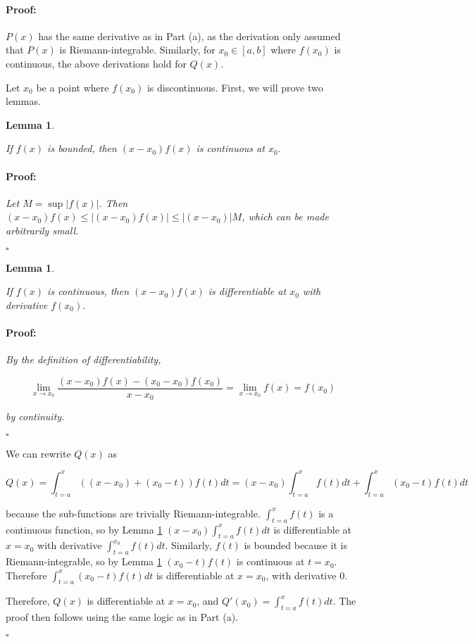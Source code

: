 \documentclass{article}
\newenvironment{proof}{\paragraph{Proof:}}{\hfill$\square$}
\newtheorem{lemma}[theorem]{Lemma}
\begin{document}
\begin{proof}

$P(x)$ has the same derivative as in Part (a), as the derivation only assumed that $P(x)$ is Riemann-integrable. Similarly, for $x_0 \in [a, b]$ where $f(x_0)$ is continuous, the above derivations hold for $Q(x)$.

Let $x_0$ be a point where $f(x_0)$ is discontinuous. First, we will prove two lemmas.

\begin{lemma}
\label{boundedIsCont}

If $f(x)$ is bounded, then $(x - x_0) f(x)$ is continuous at $x_0$.

\begin{proof}

Let $M = \sup |f(x)|$. Then $(x - x_0) f(x) \leq |(x - x_0) f(x)| \leq |(x - x_0)| M$, which can be made arbitrarily small.

\end{proof}
\end{lemma}

\begin{lemma}
\label{contIsDiff}

If $f(x)$ is continuous, then $(x - x_0) f(x)$ is differentiable at $x_0$ with derivative $f(x_0)$.

\begin{proof}

By the definition of differentiability,

\[
\lim_{x \to x_0} \frac{(x - x_0) f(x) - (x_0 - x_0) f(x_0)}{x - x_0}
= \lim_{x \to x_0} f(x) = f(x_0)
\]

by continuity.

\end{proof}
\end{lemma}

We can rewrite $Q(x)$ as

\[
Q(x) = \int_{t=a}^x ((x-x_0) + (x_0-t)) f(t) dt
= (x-x_0) \int_{t=a}^x f(t) dt + \int_{t=a}^x (x_0-t)f(t) dt
\]

because the sub-functions are trivially Riemann-integrable. $\int_{t=a}^x f(t)$ is a continuous function, so by Lemma \ref{contIsDiff} $(x-x_0) \int_{t=a}^x f(t) dt$ is differentiable at $x = x_0$ with derivative $\int_{t=a}^{x_0} f(t) dt$. Similarly, $f(t)$ is bounded because it is Riemann-integrable, so by Lemma \ref{boundedIsCont} $(x_0-t)f(t)$ is continuous at $t = x_0$. Therefore $\int_{t=a}^x (x_0-t)f(t) dt$ is differentiable at $x = x_0$, with derivative $0$.

Therefore, $Q(x)$ is differentiable at $x = x_0$, and $Q'(x_0) = \int_{t=a}^x f(t) dt$. The proof then follows using the same logic as in Part (a).

\end{proof}
\end{document}
